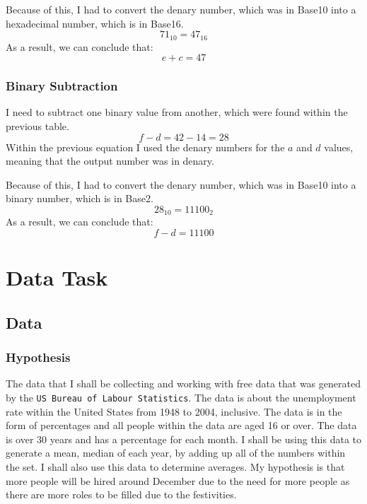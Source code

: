 \documentclass[a4paper,12pt]{article}
\begin{document}
    Because of this, I had to convert the denary number, which was in Base10 into a hexadecimal number, which is in Base16.
    \[
      71_{10} = 47_{16}
    \]
    As a result, we can conclude that:
    \[
      e + c = 47
    \]

  \subsubsection{Binary Subtraction}
    I need to subtract one binary value from another, which were found within the previous table.
    \[
      f - d = 42 - 14 = 28
    \]
    Within the previous equation I used the denary numbers for the $a$ and $d$ values, meaning that the output number was in denary.

    Because of this, I had to convert the denary number, which was in Base10 into a binary number, which is in Base2.
    \[
      28_{10} = 11100_{2}
    \]
    As a result, we can conclude that:
    \[
      f - d = 11100
    \]

\newpage

\section{Data Task}
  \subsection{Data}
    \subsubsection{Hypothesis}
      The data that I shall be collecting and working with free data that was generated by the \texttt{US Bureau of Labour Statistics}. The data is about the unemployment rate within the United States from 1948 to 2004, inclusive. The data is in the form of percentages and all people within the data are aged 16 or over.
      The data is over 30 years and has a percentage for each month. I shall be using this data to generate a mean, median of each year, by adding up all of the numbers within the set. I shall also use this data to determine averages.
      My hypothesis is that more people will be hired around December due to the need for more people as there are more roles to be filled due to the festivities.
\end{document}
